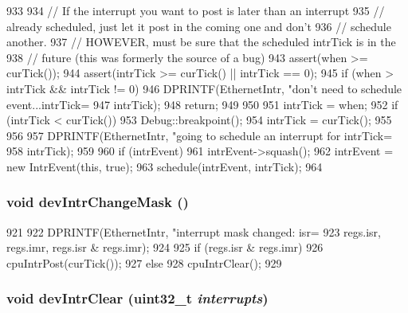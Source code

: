 \begin{DoxyCode}
933 {
934     // If the interrupt you want to post is later than an interrupt
935     // already scheduled, just let it post in the coming one and don't
936     // schedule another.
937     // HOWEVER, must be sure that the scheduled intrTick is in the
938     // future (this was formerly the source of a bug)
943     assert(when >= curTick());
944     assert(intrTick >= curTick() || intrTick == 0);
945     if (when > intrTick && intrTick != 0) {
946         DPRINTF(EthernetIntr, "don't need to schedule event...intrTick=%
947                 intrTick);
948         return;
949     }
950 
951     intrTick = when;
952     if (intrTick < curTick()) {
953         Debug::breakpoint();
954         intrTick = curTick();
955     }
956 
957     DPRINTF(EthernetIntr, "going to schedule an interrupt for intrTick=%
958             intrTick);
959 
960     if (intrEvent)
961         intrEvent->squash();
962     intrEvent = new IntrEvent(this, true);
963     schedule(intrEvent, intrTick);
964 }
\end{DoxyCode}
\hypertarget{classNSGigE_a6569a466e6023e4105fdbebe7e7088a3}{
\subsubsection[{devIntrChangeMask}]{\setlength{\rightskip}{0pt plus 5cm}void devIntrChangeMask ()}}
\label{classNSGigE_a6569a466e6023e4105fdbebe7e7088a3}



\begin{DoxyCode}
921 {
922     DPRINTF(EthernetIntr, "interrupt mask changed: isr=%
923             regs.isr, regs.imr, regs.isr & regs.imr);
924 
925     if (regs.isr & regs.imr)
926         cpuIntrPost(curTick());
927     else
928         cpuIntrClear();
929 }
\end{DoxyCode}
\hypertarget{classNSGigE_a4515fb1f38bb5bd3676748aa187c286d}{
\subsubsection[{devIntrClear}]{\setlength{\rightskip}{0pt plus 5cm}void devIntrClear ({\bf uint32\_\-t} {\em interrupts})}}
\label{classNSGigE_a4515fb1f38bb5bd3676748aa187c286d}



